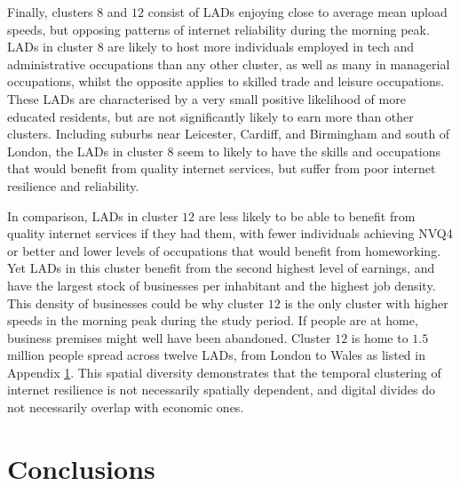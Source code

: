 \documentclass[]{interact}
\theoremstyle{plain}%
\theoremstyle{definition}
\theoremstyle{remark}
\begin{document}
Finally, clusters \(8\) and \(12\) consist of LADs enjoying close to
average mean upload speeds, but opposing patterns of internet
reliability during the morning peak. LADs in cluster \(8\) are likely to
host more individuals employed in tech and administrative occupations
than any other cluster, as well as many in managerial occupations,
whilst the opposite applies to skilled trade and leisure occupations.
These LADs are characterised by a very small positive likelihood of more
educated residents, but are not significantly likely to earn more than
other clusters. Including suburbs near Leicester, Cardiff, and
Birmingham and south of London, the LADs in cluster \(8\) seem to likely
to have the skills and occupations that would benefit from quality
internet services, but suffer from poor internet resilience and
reliability.

In comparison, LADs in cluster \(12\) are less likely to be able to
benefit from quality internet services if they had them, with fewer
individuals achieving NVQ4 or better and lower levels of occupations
that would benefit from homeworking. Yet LADs in this cluster benefit
from the second highest level of earnings, and have the largest stock of
businesses per inhabitant and the highest job density. This density of
businesses could be why cluster \(12\) is the only cluster with higher
speeds in the morning peak during the study period. If people are at
home, business premises might well have been abandoned. Cluster \(12\)
is home to \(1.5\) million people spread across twelve LADs, from London
to Wales as listed in Appendix \protect\hyperlink{appendix1}{1}. This
spatial diversity demonstrates that the temporal clustering of internet
resilience is not necessarily spatially dependent, and digital divides
do not necessarily overlap with economic ones.

\hypertarget{sec:5}{%
\section{Conclusions}\label{sec:5}}
\end{document}
